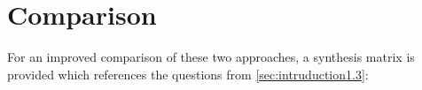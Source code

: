 \section{Comparison} \label{sec:9_comparison}

For an improved comparison of these two approaches, a synthesis matrix is provided which references the questions from \autoref{sec:intruduction1.3}:



